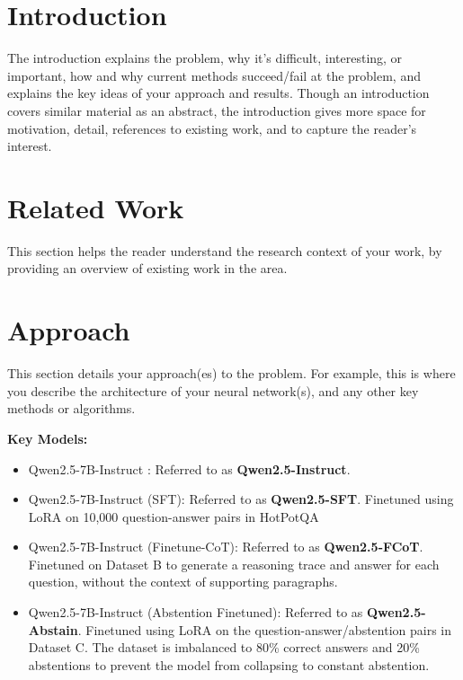 \documentclass{article}
\begin{document}

\section{Introduction}
The introduction explains the problem, why it's difficult, interesting, or important, how and why current methods succeed/fail at the problem, and explains the key ideas of your approach and results. Though an introduction covers similar material as an abstract, the introduction gives more space for motivation, detail, references to existing work, and to capture the reader's interest.

\section{Related Work}
This section helps the reader understand the research context of your work, by providing an overview of existing work in the area.

\section{Approach}
This section details your approach(es) to the problem. 
For example, this is where you describe the architecture of your neural network(s), and any other key methods or algorithms.

\textbf{Key Models:}
\begin{itemize}
\item Qwen2.5-7B-Instruct \cite{qwen2025qwen25technicalreport}: Referred to as\textbf{ Qwen2.5-Instruct}.
\item Qwen2.5-7B-Instruct (SFT): Referred to as \textbf{Qwen2.5-SFT}. Finetuned using LoRA on 10,000 question-answer pairs in HotPotQA 
\item Qwen2.5-7B-Instruct (Finetune-CoT): Referred to as \textbf{Qwen2.5-FCoT}. Finetuned on Dataset B to generate a reasoning trace and answer for each question, without the context of supporting paragraphs. 
\item Qwen2.5-7B-Instruct (Abstention Finetuned): Referred to as \textbf{Qwen2.5-Abstain}. Finetuned using LoRA on the question-answer/abstention pairs in Dataset C. The dataset is imbalanced to 80\% correct answers and 20\% abstentions to prevent the model from collapsing to constant abstention.
\end{itemize}
\end{document}
